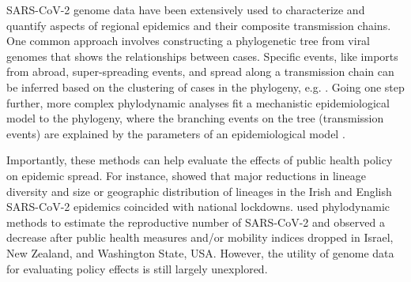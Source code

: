 \documentclass[9pt,twocolumn,twoside,lineno]{pnas-new}
\begin{document}

SARS-CoV-2 genome data have been extensively used to characterize and quantify aspects of regional epidemics and their composite transmission chains. One common approach involves constructing a phylogenetic tree from viral genomes that shows the relationships between cases. Specific events, like imports from abroad, super-spreading events, and spread along a transmission chain can be inferred based on the clustering of cases in the phylogeny, e.g. \cite{Lu2020, Eden2020, OudeMunnink2020, Bluhm2020}. Going one step further, more complex phylodynamic analyses fit a mechanistic epidemiological model to the phylogeny, where the branching events on the tree (transmission events) are explained by the parameters of an epidemiological model \cite{Grenfell2004}.  

Importantly, these methods can help evaluate the effects of public health policy on epidemic spread. For instance, \cite{Mallon2020, duPlessis2021} showed that major reductions in lineage diversity and size or geographic distribution of lineages in the Irish and English SARS-CoV-2 epidemics coincided with national lockdowns. \cite{Miller2020, Geoghegan2020a, Muller2020a} used phylodynamic methods to estimate the reproductive number of SARS-CoV-2 and observed a decrease after public health measures and/or mobility indices dropped in Israel, New Zealand, and Washington State, USA. However, the utility of genome data for evaluating policy effects is still largely unexplored.
\end{document}
